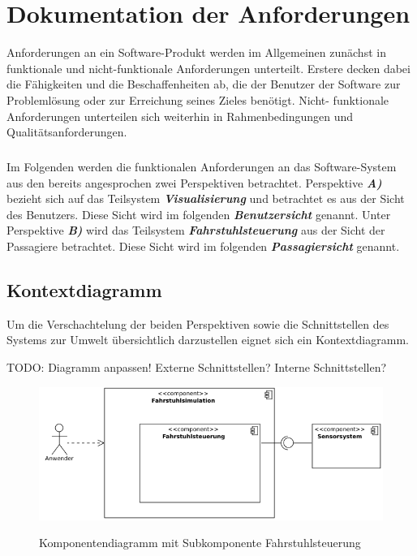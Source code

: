 \chapter{Dokumentation der Anforderungen}
Anforderungen an ein Software-Produkt werden im Allgemeinen zunächst in funktionale und nicht-funktionale Anforderungen unterteilt. Erstere decken dabei die Fähigkeiten und die Beschaffenheiten ab, die der Benutzer der Software zur Problemlösung oder zur Erreichung seines Zieles benötigt. Nicht- funktionale Anforderungen unterteilen sich weiterhin in Rahmenbedingungen und Qualitätsanforderungen.

\paragraph{}
Im Folgenden werden die funktionalen Anforderungen an das Software-System aus den bereits angesprochen zwei Perspektiven betrachtet. Perspektive \textit{\textbf{A)}} bezieht sich auf das Teilsystem \textit{\textbf{Visualisierung}} und betrachtet es aus der Sicht des Benutzers. Diese Sicht wird im folgenden \textit{\textbf{Benutzersicht}} genannt. Unter Perspektive \textit{\textbf{B)}} wird das Teilsystem \textit{\textbf{Fahrstuhlsteuerung}} aus der Sicht der Passagiere betrachtet. Diese Sicht wird im folgenden \textit{\textbf{Passagiersicht}} genannt.

\newpage
\section{Kontextdiagramm}
Um die Verschachtelung der beiden Perspektiven sowie die Schnittstellen des Systems zur Umwelt übersichtlich darzustellen eignet sich ein Kontextdiagramm.

TODO: Diagramm anpassen! Externe Schnittstellen? Interne Schnittstellen?

\begin{figure}[hbt]
	\includegraphics{images/komponentendiagramm.png}
	\label{fig:komponentendiagramm}
	\caption{Komponentendiagramm mit Subkomponente Fahrstuhlsteuerung}
\end{figure}

